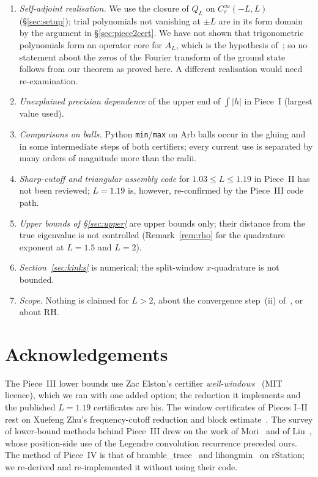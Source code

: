 \documentclass[11pt]{amsart}
\newcommand{\Lmax}{2}                                     %
\theoremstyle{definition}
\theoremstyle{remark}
\numberwithin{equation}{section}
\begin{document}
\begin{enumerate}
\item \emph{Self-adjoint realisation.} We use the closure of $Q_L$ on $C_c^\infty(-L,L)$ (\S\ref{sec:setup}); trial polynomials not vanishing at $\pm L$ are in its form domain by the argument in \S\ref{sec:piece2cert}. We have not shown that trigonometric polynomials form an operator core for $A_L$, which is the hypothesis of~\cite[Thm.~6.1]{CvS}; so no statement about the zeros of the Fourier transform of the ground state follows from our theorem as proved here. A different realisation would need re-examination.
\item \emph{Unexplained precision dependence} of the upper end of $\int|h|$ in Piece~I (largest value used).
\item \emph{Comparisons on balls.} Python \texttt{min}/\texttt{max} on Arb balls occur in the gluing and in some intermediate steps of both certifiers; every current use is separated by many orders of magnitude more than the radii.
\item \emph{Sharp-cutoff and triangular assembly code} for $1.03\le L\le1.19$ in Piece~II has not been reviewed; $L=1.19$ is, however, re-confirmed by the Piece~III code path.
\item \emph{Upper bounds of \S\ref{sec:upper}} are upper bounds only; their distance from the true eigenvalue is not controlled (Remark~\ref{rem:rho} for the quadrature exponent at $L=1.5$ and $L=2$).
\item \emph{Section~\ref{sec:kinks}} is numerical; the split-window $x$-quadrature is not bounded.
\item \emph{Scope.} Nothing is claimed for $L>\Lmax$, about the convergence step~(ii) of~\cite{CCM25}, or about RH.
\end{enumerate}

\section*{Acknowledgements}
The Piece~III lower bounds use Zac Elston's certifier \emph{weil-windows}~\cite{Elston} (MIT licence), which we ran with one added option; the reduction it implements and the published $L=1.19$ certificates are his. The window certificates of Pieces I--II rest on Xuefeng Zhu's frequency-cutoff reduction and block estimate~\cite{Zhu}. The survey of lower-bound methods behind Piece~III drew on the work of Mori~\cite{Mori} and of Liu~\cite{Liu}, whose position-side use of the Legendre convolution recurrence preceded ours. The method of Piece~IV is that of bramble\_trace~\cite{rh60} and lihongmin~\cite{rh45} on rStation; we re-derived and re-implemented it without using their code.
\end{document}
